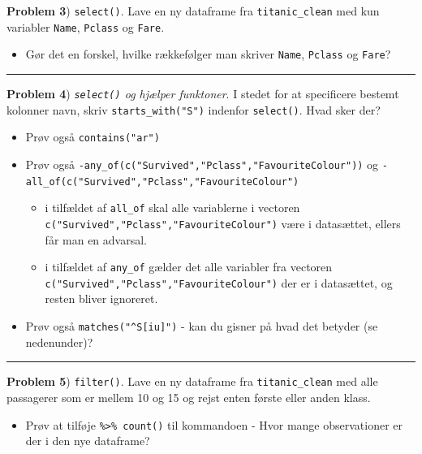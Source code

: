 \documentclass[
]{book}
\providecommand{\tightlist}{%
  \setlength{\itemsep}{0pt}\setlength{\parskip}{0pt}}
\begin{document}
\textbf{Problem 3}) \texttt{select()}. Lave en ny dataframe fra \texttt{titanic\_clean} med kun variabler \texttt{Name}, \texttt{Pclass} og \texttt{Fare}.

\begin{itemize}
\tightlist
\item
  Gør det en forskel, hvilke rækkefølger man skriver \texttt{Name}, \texttt{Pclass} og \texttt{Fare}?
\end{itemize}

\begin{center}\rule{0.5\linewidth}{0.5pt}\end{center}

\textbf{Problem 4}) \emph{\texttt{select()} og hjælper funktoner}. I stedet for at specificere bestemt kolonner navn, skriv \texttt{starts\_with("S")} indenfor \texttt{select()}. Hvad sker der?

\begin{itemize}
\item
  Prøv også \texttt{contains("ar")}
\item
  Prøv også \texttt{-any\_of(c("Survived","Pclass","FavouriteColour"))} og \texttt{-all\_of(c("Survived","Pclass","FavouriteColour")}

  \begin{itemize}
  \tightlist
  \item
    i tilfældet af \texttt{all\_of} skal alle variablerne i vectoren \texttt{c("Survived","Pclass","FavouriteColour")} være i datasættet, ellers får man en advarsal.
  \item
    i tilfældet af \texttt{any\_of} gælder det alle variabler fra vectoren \texttt{c("Survived","Pclass","FavouriteColour")} der er i datasættet, og resten bliver ignoreret.
  \end{itemize}
\item
  Prøv også \texttt{matches("\^{}S{[}i\textbar{}u{]}")} - kan du gisner på hvad det betyder (se nedenunder)?
\end{itemize}

\begin{center}\rule{0.5\linewidth}{0.5pt}\end{center}

\textbf{Problem 5}) \texttt{filter()}. Lave en ny dataframe fra \texttt{titanic\_clean} med alle passagerer som er mellem 10 og 15 og rejst enten første eller anden klass.

\begin{itemize}
\tightlist
\item
  Prøv at tilføje \texttt{\%\textgreater{}\%\ count()} til kommandoen - Hvor mange observationer er der i den nye dataframe?
\end{itemize}
\end{document}
